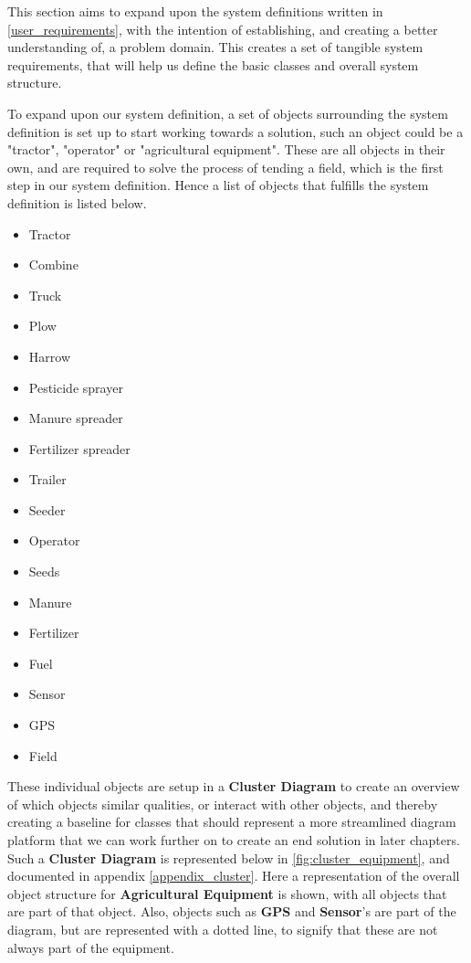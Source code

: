 This section aims to expand upon the system definitions written in \autoref{user_requirements}, with the intention of establishing, and creating a better understanding of, a problem domain. This creates a set of tangible system requirements, that will help us define the basic classes and overall system structure.

To expand upon our system definition, a set of objects surrounding the system definition is set up to start working towards a solution, such an object could be a "tractor", "operator" or "agricultural equipment". These are all objects in their own, and are required to solve the process of tending a field, which is the first step in our system definition. Hence a list of objects that fulfills the system definition is listed below.

\begin{itemize}[noitemsep]
    \item Tractor
    \item Combine
    \item Truck
    \item Plow
    \item Harrow
    \item Pesticide sprayer
    \item Manure spreader
    \item Fertilizer spreader
    \item Trailer
    \item Seeder
    \item Operator
    \item Seeds
    \item Manure
    \item Fertilizer
    \item Fuel
    \item Sensor
    \item GPS
    \item Field
\end{itemize}

These individual objects are setup in a \textbf{Cluster Diagram} to create an overview of which objects similar qualities, or interact with other objects, and thereby creating a baseline for classes that should represent a more streamlined diagram platform that we can work further on to create an end solution in later chapters. Such a \textbf{Cluster Diagram} is represented below in \autoref{fig:cluster_equipment}, and documented in appendix \autoref{appendix_cluster}. Here a representation of the overall object structure for \textbf{Agricultural Equipment} is shown, with all objects that are part of that object. Also, objects such as \textbf{GPS} and \textbf{Sensor}'s are part of the diagram, but are represented with a dotted line, to signify that these are not always part of the equipment.


